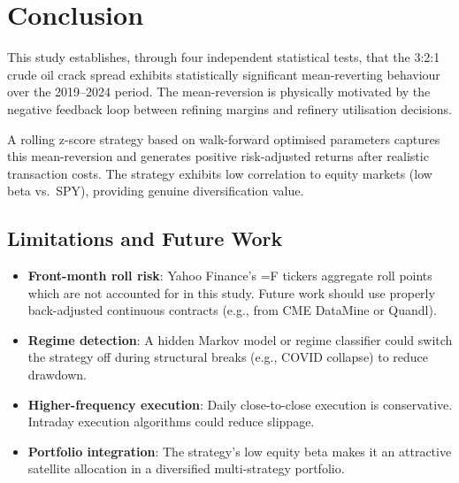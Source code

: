 \documentclass[12pt,a4paper]{article}
\begin{document}
\section{Conclusion}

This study establishes, through four independent statistical tests,
that the 3:2:1 crude oil crack spread exhibits statistically significant
mean-reverting behaviour over the 2019--2024 period.
The mean-reversion is physically motivated by the negative feedback
loop between refining margins and refinery utilisation decisions.

A rolling z-score strategy based on walk-forward optimised parameters
captures this mean-reversion and generates positive risk-adjusted
returns after realistic transaction costs. The strategy exhibits
low correlation to equity markets (low beta vs.\ SPY), providing
genuine diversification value.

\subsection{Limitations and Future Work}
\begin{itemize}
  \item \textbf{Front-month roll risk}: Yahoo Finance's =F tickers
        aggregate roll points which are not accounted for in this study.
        Future work should use properly back-adjusted continuous contracts
        (e.g., from CME DataMine or Quandl).
  \item \textbf{Regime detection}: A hidden Markov model or regime
        classifier could switch the strategy off during structural
        breaks (e.g., COVID collapse) to reduce drawdown.
  \item \textbf{Higher-frequency execution}: Daily close-to-close
        execution is conservative. Intraday execution algorithms could
        reduce slippage.
  \item \textbf{Portfolio integration}: The strategy's low equity
        beta makes it an attractive satellite allocation in a
        diversified multi-strategy portfolio.
\end{itemize}
\end{document}
